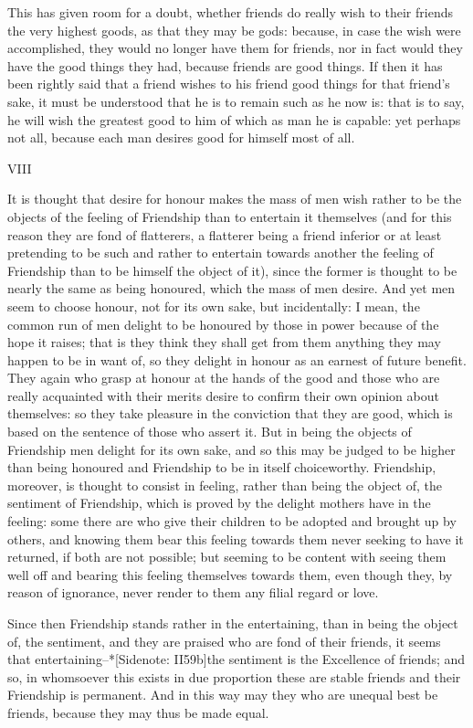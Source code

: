 This has given room for a doubt, whether friends do really wish to their
friends the very highest goods, as that they may be gods: because, in
case the wish were accomplished, they would no longer have them for
friends, nor in fact would they have the good things they had, because
friends are good things. If then it has been rightly said that a friend
wishes to his friend good things for that friend's sake, it must be
understood that he is to remain such as he now is: that is to say, he
will wish the greatest good to him of which as man he is capable: yet
perhaps not all, because each man desires good for himself most of all.

VIII

It is thought that desire for honour makes the mass of men wish rather
to be the objects of the feeling of Friendship than to entertain it
themselves (and for this reason they are fond of flatterers, a flatterer
being a friend inferior or at least pretending to be such and rather to
entertain towards another the feeling of Friendship than to be himself
the object of it), since the former is thought to be nearly the same as
being honoured, which the mass of men desire. And yet men seem to choose
honour, not for its own sake, but incidentally: I mean, the common run
of men delight to be honoured by those in power because of the hope it
raises; that is they think they shall get from them anything they may
happen to be in want of, so they delight in honour as an earnest of
future benefit. They again who grasp at honour at the hands of the good
and those who are really acquainted with their merits desire to confirm
their own opinion about themselves: so they take pleasure in the
conviction that they are good, which is based on the sentence of those
who assert it. But in being the objects of Friendship men delight for
its own sake, and so this may be judged to be higher than being honoured
and Friendship to be in itself choiceworthy. Friendship, moreover, is
thought to consist in feeling, rather than being the object of, the
sentiment of Friendship, which is proved by the delight mothers have in
the feeling: some there are who give their children to be adopted and
brought up by others, and knowing them bear this feeling towards them
never seeking to have it returned, if both are not possible; but seeming
to be content with seeing them well off and bearing this feeling
themselves towards them, even though they, by reason of ignorance, never
render to them any filial regard or love.

Since then Friendship stands rather in the entertaining, than in being
the object of, the sentiment, and they are praised who are fond of their
friends, it seems that entertaining--*[Sidenote: II59b]the sentiment is
the Excellence of friends; and so, in whomsoever this exists in due
proportion these are stable friends and their Friendship is permanent.
And in this way may they who are unequal best be friends, because they
may thus be made equal.

